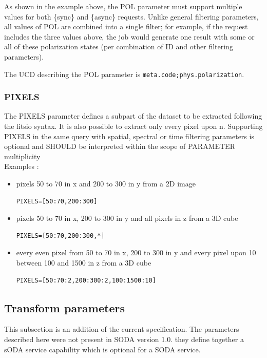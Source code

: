 \documentclass[11pt,a4paper]{ivoa}
\newcommand{\ucd}[1]{\texttt{#1}}
\begin{document}
As shown in the example above, the POL parameter must support multiple values 
for both \{sync\} and \{async\} requests.  Unlike general filtering parameters, 
all values of POL are combined into a single filter; for example, if the request
includes the three values above, the job would generate one result with
some or all of these polarization states (per combination of ID and
other filtering parameters).

The UCD  describing the POL parameter is
\ucd{meta.code;phys.polarization}.

\subsubsection{PIXELS}
\label{sec:PIXELS}
The PIXELS parameter defines a subpart of the dataset to be extracted following the fitsio syntax. 
It is also possible to extract only every pixel upon n. Supporting PIXELS in the same query with spatial, spectral or time filtering
parameters is optional and SHOULD be interpreted within the scope of PARAMETER multiplicity\\
Examples :

\begin{itemize}
\item pixels 50 to 70 in x and 200 to 300 in y from a 2D image 
\begin{lstlisting}
PIXELS=[50:70,200:300]
\end{lstlisting}

\item pixels 50 to 70 in x, 200 to 300  in y and all pixels in z  from a 3D cube
\begin{lstlisting}
PIXELS=[50:70,200:300,*]
\end{lstlisting}

\item every even pixel from 50 to 70 in x, 200 to 300  in y and every pixel upon 10 between 100 and 1500 in z   from a 3D cube
\begin{lstlisting}
PIXELS=[50:70:2,200:300:2,100:1500:10]
\end{lstlisting}

\end{itemize}

\subsection{Transform parameters}

This subsection is an addition of the current specification. The parameters described here were not present in SODA version 1.0. they define together a sODA service capability which is optional for a SODA service.
\end{document}
